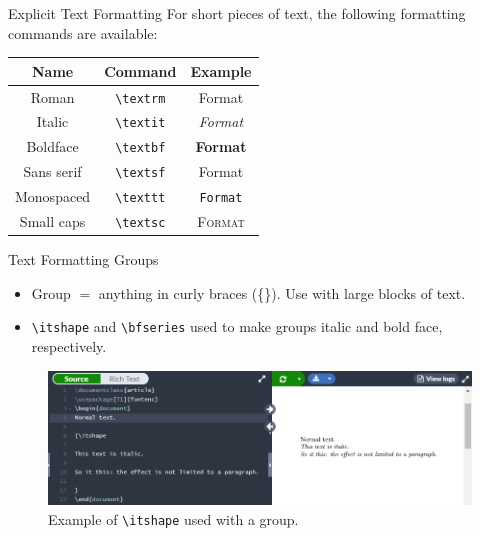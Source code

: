 \documentclass{beamer}
\begin{document}
{  \begin{frame}{Explicit Text Formatting}
    For short pieces of text, the following formatting commands are available:
    \begin{table}
      \begin{tabular}{c|c|c}
        \textbf{Name} & \textbf{Command}               & \textbf{Example} \\ \hline
        Roman         & \texttt{\textbackslash textrm} & \textrm{Format} \\ \hline
        Italic        & \texttt{\textbackslash textit} & \textit{Format} \\ \hline
        Boldface      & \texttt{\textbackslash textbf} & \textbf{Format} \\ \hline
        Sans serif    & \texttt{\textbackslash textsf} & \textsf{Format} \\ \hline
        Monospaced    & \texttt{\textbackslash texttt} & \texttt{Format} \\ \hline
        Small caps    & \texttt{\textbackslash textsc} & \textsc{Format}
      \end{tabular}
    \end{table}
  \end{frame}

  \begin{frame}{Text Formatting Groups}
    \begin{itemize}
      \item Group $=$ anything in curly braces (\{\}). Use with large blocks of text.
      \item \texttt{\textbackslash itshape} and \texttt{\textbackslash bfseries} used to make groups italic and bold face, respectively.
    \end{itemize}
    \begin{figure}
      \includegraphics[width=0.8\linewidth]{day02-02C-groups.png}
      \caption{Example of \texttt{\textbackslash itshape} used with a group.}
      \label{fig:day02-02C}
    \end{figure}
  \end{frame}

}
\end{document}
